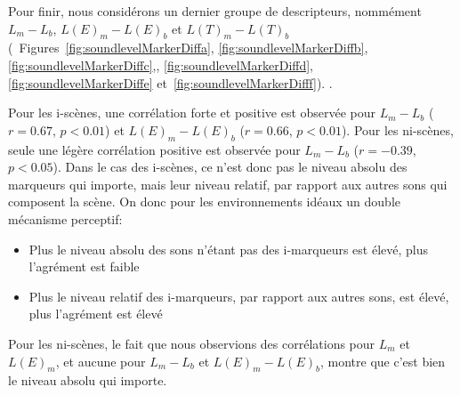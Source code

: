 Pour finir, nous considérons un dernier groupe de descripteurs, nommément $L_m-L_b$, $L(E)_m-L(E)_b$ et $L(T)_m-L(T)_b$ (\Cf~Figures~\ref{fig:soundlevelMarkerDiffa}, \ref{fig:soundlevelMarkerDiffb}, \ref{fig:soundlevelMarkerDiffc},, \ref{fig:soundlevelMarkerDiffd}, \ref{fig:soundlevelMarkerDiffe} et~\ref{fig:soundlevelMarkerDifff}).  .

Pour les i-scènes, une corrélation forte et positive est observée pour $L_m-L_b$ ($r=0.67$, $p<0.01$) et $L(E)_m-L(E)_b$ ($r=0.66$, $p<0.01$). Pour les ni-scènes, seule une légère corrélation positive est observée pour $L_m-L_b$ ($r=-0.39$, $p<0.05$). Dans le cas des i-scènes, ce n'est donc pas le niveau absolu des marqueurs qui importe, mais leur niveau relatif, par rapport aux autres sons qui composent la scène. On   donc pour les environnements idéaux un double mécanisme perceptif: 

\begin{itemize}
\item Plus le niveau absolu des sons n'étant pas des i-marqueurs est élevé, plus l'agrément est faible
\item Plus le niveau relatif des i-marqueurs, par rapport aux autres sons, est élevé, plus l'agrément est élevé
\end{itemize}

Pour les ni-scènes, le fait que nous observions des corrélations pour $L_m$ et $L(E)_m$, et aucune pour $L_m-L_b$ et $L(E)_m-L(E)_b$, montre que c'est bien le niveau absolu qui importe.

